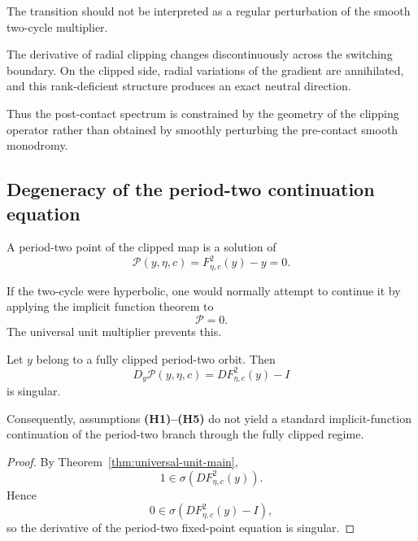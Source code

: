 \begin{remark}
\label{rem:spectral-transition-not-small-jump}
The transition should not be interpreted as a regular perturbation
of the smooth two-cycle multiplier.

The derivative of radial clipping changes discontinuously across
the switching boundary.  On the clipped side, radial variations of
the gradient are annihilated, and this rank-deficient structure
produces an exact neutral direction.

Thus the post-contact spectrum is constrained by the geometry of
the clipping operator rather than obtained by smoothly perturbing
the pre-contact smooth monodromy.
\end{remark}

\subsection{Degeneracy of the period-two continuation equation}
\label{subsec:continuation-degeneracy}

A period-two point of the clipped map is a solution of
\begin{equation}
\mathcal P(y,\eta,c)
=
F_{\eta,c}^2(y)-y
=
0.
\label{eq:period-two-continuation-equation}
\end{equation}

If the two-cycle were hyperbolic, one would normally attempt to
continue it by applying the implicit function theorem to
\[
\mathcal P=0.
\]
The universal unit multiplier prevents this.

\begin{proposition}
\label{prop:continuation-singularity}
Let $y$ belong to a fully clipped period-two orbit. Then
\begin{equation}
D_y\mathcal P(y,\eta,c)
=
DF_{\eta,c}^2(y)-I
\label{eq:period-two-equation-Jacobian}
\end{equation}
is singular.

Consequently, assumptions \textbf{(H1)--(H5)} do not yield a
standard implicit-function continuation of the period-two branch
through the fully clipped regime.
\end{proposition}

\begin{proof}
By Theorem~\ref{thm:universal-unit-main},
\[
1
\in
\sigma
\left(
DF_{\eta,c}^2(y)
\right).
\]
Hence
\[
0
\in
\sigma
\left(
DF_{\eta,c}^2(y)-I
\right),
\]
so the derivative of the period-two fixed-point equation is
singular.
\end{proof}

